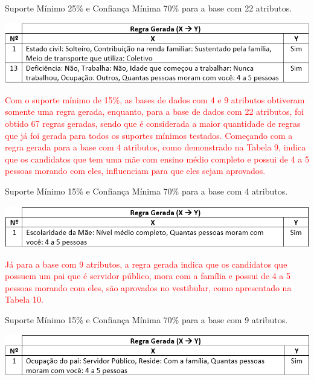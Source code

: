 \par
\begin{table}[!htp]
	\begin{center}
    \caption{\label{fig:waveform_fig} Suporte Mínimo 25\% e Confiança Mínima 70\% para a base com 22 atributos.}
	\includegraphics[scale=0.75]{Figuras/Suporte_25_atributos_22.png}
	\end{center}
\end{table}

\par
\textcolor{red}{Com o suporte mínimo de 15\%, as bases de dados com 4 e 9 atributos obtiveram somente uma regra gerada, enquanto, para a base de dados com 22 atributos, foi obtido 67 regras geradas, sendo que é considerada a maior quantidade de regras que já foi gerada para todos os suportes mínimos testados. Começando com a regra gerada para a base com 4 atributos, como demonstrado na Tabela 9, indica que os candidatos que tem uma mãe com ensino médio completo e possui de 4 a 5 pessoas morando com eles, influenciam para que eles sejam aprovados.}

\par
\begin{table}[!htp]
	\begin{center}
    \caption{\label{fig:waveform_fig} Suporte Mínimo 15\% e Confiança Mínima 70\% para a base com 4 atributos.}
	\includegraphics[scale=0.75]{Figuras/Suporte_15_atributos_4.png}
	\end{center}
\end{table}

\par
\textcolor{red}{Já para a base com 9 atributos, a regra gerada indica que os candidatos que possuem um pai que é servidor público, mora com a família e possui de 4 a 5 pessoas morando com eles, são aprovados no vestibular, como apresentado na Tabela 10.}

\par
\begin{table}[!htp]
	\begin{center}
    \caption{\label{fig:waveform_fig} Suporte Mínimo 15\% e Confiança Mínima 70\% para a base com 9 atributos.}
	\includegraphics[scale=0.75]{Figuras/Suporte_15_atributos_9.png}
	\end{center}
\end{table}

